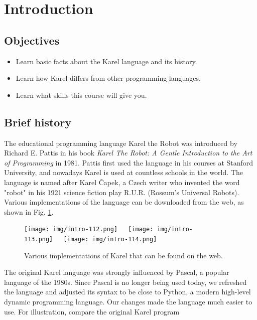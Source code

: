 \section{Introduction}

\subsection{Objectives} 

\begin{itemize}
\item Learn basic facts about the Karel language and its history. 
\item Learn how Karel differs from other programming languages.
\item Learn what skills this course will give you.
\end{itemize}

\subsection{Brief history}

The educational programming language Karel the Robot was introduced by Richard E. 
Pattis in his book {\em Karel The Robot: A Gentle Introduction to the Art of Programming} in 1981. 
Pattis first used the language in his courses at Stanford University, and nowadays Karel is used at 
countless schools in the world. The language is named after Karel \v{C}apek, a Czech writer 
who invented the word "robot" in his 1921 science fiction play R.U.R. (Rossum's Universal Robots).
Various implementations of the language can be downloaded from the web, as shown in Fig. 
\ref{fig:intro-111}.

\begin{figure}[!ht]
\begin{center}
\texttt{[image: img/intro-112.png]}\ \ \ 
\texttt{[image: img/intro-113.png]}\ \ \ 
\texttt{[image: img/intro-114.png]}
\caption{Various implementations of Karel that can be found on the web.}
\vspace{-4mm}
\label{fig:intro-111}
\end{center}
\end{figure}
\noindent
The original Karel language was strongly influenced by Pascal, a popular
language of the 1980s. 
Since Pascal is no longer being used today, we refreshed 
the language and adjusted its syntax to be close to Python, a modern high-level 
dynamic programming language. Our changes made the language much easier
to use. For illustration, compare the original Karel program\\

